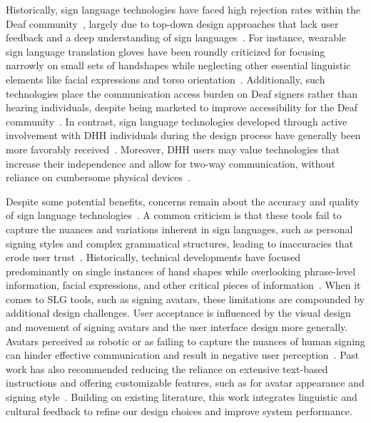Historically, sign language technologies have faced high rejection rates within the Deaf community~\cite{Hsu2024unintel,vogel2024factors,gugenheimer2017impact}, largely due to top-down design approaches that lack user feedback and a deep understanding of sign languages~\cite{kipp2011assessing,mohr2017three,zhang2024illuminating,prietch2022systematic}. For instance, wearable sign language translation gloves have been roundly criticized for focusing narrowly on small sets of handshapes while neglecting other essential linguistic elements like facial expressions and torso orientation~\cite{michael2017why}. Additionally, such technologies place the communication access burden on Deaf signers rather than hearing individuals, despite being marketed to improve accessibility for the Deaf community~\cite{visual2019}. In contrast, sign language technologies developed through active involvement with DHH individuals during the design process have generally been more favorably received~\cite{inan2024generating,kipp2011assessing,boudreault2024closed,anindhita2016designing,kipp2011sign}. Moreover, DHH users may value technologies that increase their independence and allow for two-way communication, without reliance on cumbersome physical devices~\cite{michael2017why,hill2020deaf}.

Despite some potential benefits, concerns remain about the accuracy and quality of sign language technologies~\cite{lee2021american,kipp2011sign,huenerfauth2009linguistically,kipp2011assessing,ebling2016building}. A common criticism is that these tools fail to capture the nuances and variations inherent in sign languages, such as personal signing styles and complex grammatical structures, leading to inaccuracies that erode user trust~\cite{kipp2011assessing,lee2021american,kipp2011sign,huenerfauth2009linguistically,ebling2016building}. Historically, technical developments have focused predominantly on single instances of hand shapes while overlooking phrase-level information, facial expressions, and other critical pieces of information~\cite{ebling2016building,huenerfauth2009linguistically,kipp2011assessing}. When it comes to SLG tools, such as signing avatars, these limitations are compounded by additional design challenges. User acceptance is influenced by the visual design and movement of signing avatars and the user interface design more generally. Avatars perceived as robotic or as failing to capture the nuances of human signing can hinder effective communication and result in negative user perception~\cite{kipp2011assessing,tran2023us,huenerfauth2009sign,quandt2022attitudes}. Past work has also recommended reducing the reliance on extensive text-based instructions and offering customizable features, such as for avatar appearance and signing style~\cite{quandt2022attitudes,muir2005perception,tran2023us}. Building on existing literature, this work integrates linguistic and cultural feedback to refine our design choices and improve system performance. 
